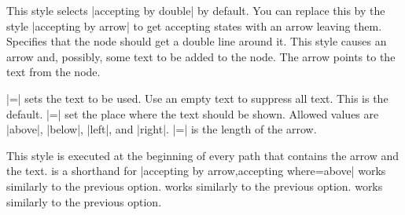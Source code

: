 \begin{itemize}
  This style selects |accepting by double| by default. You can replace
  this by the style |accepting by arrow| to get accepting states with
  an arrow leaving them.
  Specifies that the node should get a double line around it.
  This style causes an arrow and, possibly, some text to be added to
  the node. The arrow points to the text from the node.
  \begin{itemize}
  |=| sets the text to be
  used. Use an empty text to suppress all text. This is the default.
  |=| set the place where
  the text should be shown. Allowed values are |above|, |below|,
  |left|, and |right|.
  |=| is the length of the
  arrow.
  \end{itemize}
\begin{codeexample}[]
\end{codeexample}
  This style is executed at the beginning of every path that contains
  the arrow and the text.
   is a shorthand for
  |accepting by arrow,accepting where=above|
   works similarly to the previous option.
   works similarly to the previous option.
   works similarly to the previous option.
\end{itemize}



